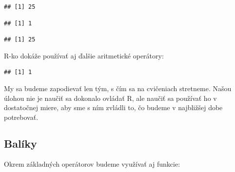 \begin{verbatim}
## [1] 25
\end{verbatim}

\begin{Shaded}
\begin{Highlighting}[]
 \OperatorTok{/}\StringTok{ }
\end{Highlighting}
\end{Shaded}

\begin{verbatim}
## [1] 1
\end{verbatim}

\begin{Shaded}
\begin{Highlighting}[]
\OperatorTok{^}
\end{Highlighting}
\end{Shaded}

\begin{verbatim}
## [1] 25
\end{verbatim}

R-ko dokáže používať aj ďalšie aritmetické operátory:

\begin{Shaded}
\end{Shaded}

\begin{verbatim}
## [1] 1
\end{verbatim}

My sa budeme zapodievať len tým, s čím sa na cvičeniach stretneme. Našou
úlohou nie je naučiť sa dokonalo ovládať R, ale naučiť sa používať ho v
dostatočnej miere, aby sme s ním zvládli to, čo budeme v najbližšej dobe
potrebovať.

\hypertarget{baluxedky}{%
\subsection{Balíky}\label{baluxedky}}

Okrem základných operátorov budeme využívať aj funkcie:

\begin{Shaded}
\begin{Highlighting}[]
\NormalTok{(}\NormalTok{, }\NormalTok{, }\NormalTok{)}
\end{Highlighting}
\end{Shaded}

